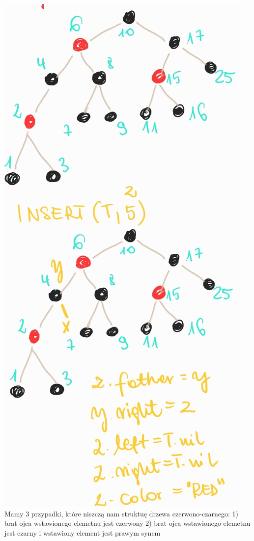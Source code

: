 \documentclass[12pt]{article}
\begin{document}
\includegraphics[scale=0.5]{zad8_1.png}
Mamy 3 przypadki, które niszczą nam struktuę drzewa czerwono-czarnego:
1) brat ojca wstawionego elemetnu jest czerwony
2) brat ojca wstawionego elemetnu jest czarny i wstawiony element jest prawym synem
\end{document}
